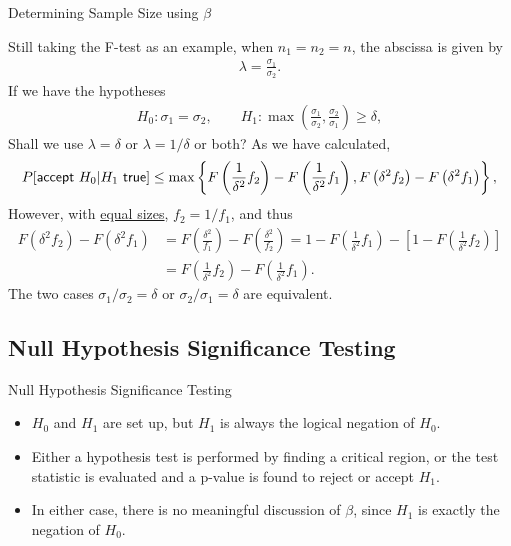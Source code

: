 \begin{frame}{Determining Sample Size using $\beta$}

\justifying
{} Still taking the F-test as an example, when $n_1 = n_2 = n$, the abscissa is given by
\footnotesize
\begin{align*}
\lambda = \frac{\sigma_1}{\sigma_2}.
\end{align*}
\normalsize
If we have the hypotheses
\footnotesize
\begin{align*}
H_0: \sigma_1 = \sigma_2,\qquad H_1: \max\left(\frac{\sigma_1}{\sigma_2}, \frac{\sigma_2}{\sigma_1}\right) \geq \delta,
\end{align*}
\normalsize
Shall we use $\lambda = \delta$ or $\lambda = 1/\delta$ or both? As we have calculated,
\footnotesize
\begin{align*}
P[\mathsf{accept\ } H_0|H_1 \mathsf{\ true}] \leq \max\left\{F\left(\frac{1}{\delta^2} f_2 \right) - F\left(\frac{1}{\delta^2} f_1 \right), F\left(\delta^2 f_2 \right) - F\left(\delta^2 f_1 \right) \right\},
\end{align*}
\normalsize
However, with \underline{equal sizes}, $f_2 = 1/f_1$, and thus
\footnotesize
\begin{align*}
F\left(\delta^2 f_2 \right) - F\left(\delta^2 f_1 \right) & = F\left(\frac{\delta^2}{f_1}\right) - F\left(\frac{\delta^2}{f_2} \right) = 1 - F\left(\frac{1}{\delta^2}f_1 \right) - \left[1 - F\left(\frac{1}{\delta^2}f_2 \right) \right] \\
& = F\left(\frac{1}{\delta^2} f_2 \right) - F\left(\frac{1}{\delta^2} f_1 \right).
\end{align*}
\normalsize
The two cases $\sigma_1 / \sigma_2 = \delta$ or $\sigma_2 / \sigma_1 = \delta$ are equivalent.


\end{frame}



\subsection{Null Hypothesis Significance Testing}

\begin{frame}{Null Hypothesis Significance Testing}

\begin{itemize}
	\justifying
	\item $H_0$ and $H_1$ are set up, but $H_1$ is always the logical negation of $H_0$.
	\item Either a hypothesis test is performed by finding a critical region, or the test statistic is evaluated and a p-value is found to reject or accept $H_1$.
	\item In either case, there is no meaningful discussion of $\beta$, since $H_1$ is exactly the negation of $H_0$.
\end{itemize}

\end{frame}


